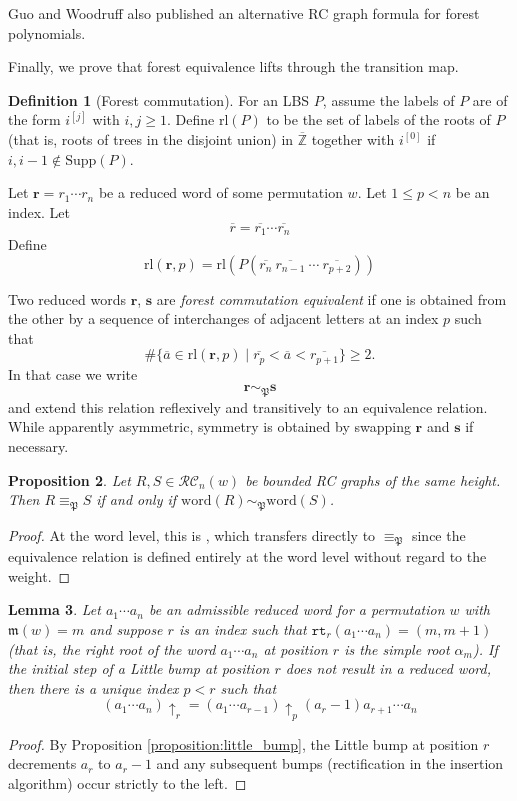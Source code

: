 \documentclass{amsart}
\newtheorem{lemma}{Lemma}[subsection]
\newtheorem{proposition}[lemma]{Proposition}
\theoremstyle{definition}
\newtheorem{definition}[lemma]{Definition}
\theoremstyle{remark}
\numberwithin{equation}{subsection}
\newcommand{\rtt}{\mathtt{rt}}
\newcommand{\RC}{\mathcal{RC}}
\newcommand{\ltb}[2]{#1\!\uparrow_{#2}}
\newcommand{\forest}{\mathfrak{P}}
\newcommand{\maxd}{\mathfrak{m}}
\begin{document}
Guo and Woodruff \cite{guo2026forest} also published an alternative RC graph formula for forest polynomials.

Finally, we prove that forest equivalence lifts through the transition map. %

\begin{definition}[Forest commutation]
For an LBS $P$, assume the labels of $P$ are of the form $i^[j]$ with $i,j\geq 1$. Define $\mathrm{rl}(P)$ to be the set of labels of the roots of $P$ (that is, roots of trees in the disjoint union) in $\overline{\mathbb{Z}}$ together with $i^[0]$ if $i, i-1\notin \mathrm{Supp}(P)$.

Let $\mathbf{r}=r_1\cdots r_n$ be a reduced word of some permutation $w$. Let $1\leq p<n$ be an index. Let 
$$\overline{r}=\overline{r_1}\cdots \overline{r_n}$$
Define 
$$\mathrm{rl}(\mathbf{r},p) = \mathrm{rl}(P(\overline{r_{n}}\ \overline{r_{n-1}}\ \cdots \ \overline{r_{p+2}}))$$

Two reduced words $\mathbf{r}$, $\mathbf{s}$ are \emph{forest commutation equivalent} if one is obtained from the other by a sequence of interchanges of adjacent letters at an index $p$ such that 
$$\#\{\overline{a}\in\mathrm{rl}(\mathbf{r},p)\mid \overline{r_p}<\overline{a}<\overline{r_{p+1}}\}\geq 2.$$
In that case we write 
$$\mathbf{r}\sim_\forest\mathbf{s}$$
and extend this relation reflexively and transitively to an equivalence relation. While apparently asymmetric, symmetry is obtained by swapping $\mathbf{r}$ and $\mathbf{s}$ if necessary.
\end{definition}

\begin{proposition} \label{proposition:forestcommute}
Let $R,S\in \RC_n(w)$ be bounded RC graphs of the same height. Then $R\equiv_\forest S$ if and only if $\mathrm{word}(R)\sim_\forest \mathrm{word}(S)$.
\end{proposition}
\begin{proof}
At the word level, this is \cite[Proposition~5.8]{nadeau2023permutahedral}, which transfers directly to $\equiv_\forest$ since the equivalence relation is defined entirely at the word level without regard to the weight.
\end{proof}


\begin{lemma} \label{lemma:littlebumprecurse}
  Let $a_1\cdots a_n$ be an admissible reduced word for a permutation $w$ with $\maxd(w)=m$ and suppose $r$ is an index such that $\rtt_r(a_1\cdots a_n)=(m, m+1)$ (that is, the right root of the word $a_1\cdots a_n$ at position $r$ is the simple root $\alpha_m$). If the initial step of a Little bump at position $r$ does not result in a reduced word, then there is a unique index $p<r$ such that
  $$\ltb{(a_1\cdots a_n)}{r} = \ltb{(a_1\cdots a_{r-1})}{p}(a_r - 1)a_{r+1}\cdots a_n$$
\end{lemma}
\begin{proof}
  By Proposition \ref{proposition:little_bump}, the Little bump at position $r$ decrements $a_r$ to $a_r - 1$ and any subsequent bumps (rectification in the insertion algorithm) occur strictly to the left.
\end{proof}
\end{document}
